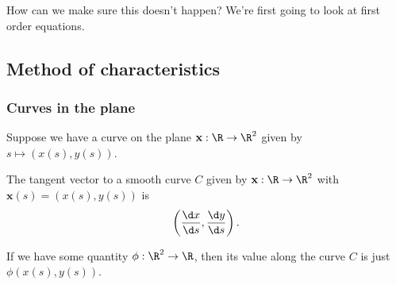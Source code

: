 \documentclass[a4paper]{article}
\begin{document}
How can we make sure this doesn't happen? We're first going to look at first order equations.

\subsection{Method of characteristics}
\subsubsection*{Curves in the plane}
Suppose we have a curve on the plane $\mathbf{x}: \R \to \R^2$ given by $s\mapsto (x(s), y(s))$.

\begin{defi}
  The tangent vector to a smooth curve $C$ given by $\mathbf{x}: \R \to \R^2$ with $\mathbf{x}(s) = (x(s), y(s))$ is
  \[
    \left(\frac{\d x}{\d s}, \frac{\d y}{\d s}\right).
  \]
\end{defi}

If we have some quantity $\phi: \R^2 \to \R$, then its value along the curve $C$ is just $\phi(x(s), y(s))$.
\end{document}
